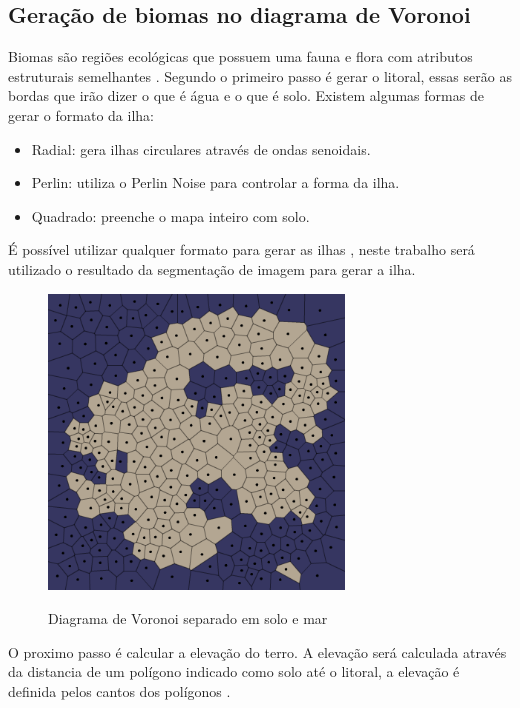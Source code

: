 \subsection{Geração de biomas no diagrama de Voronoi}

Biomas são regiões ecológicas que possuem uma fauna e flora com atributos estruturais semelhantes \cite{maestrovirtuale}. Segundo  o primeiro passo é gerar o litoral, essas serão as bordas que irão dizer o que é água e o que é solo. Existem algumas formas de gerar o formato da ilha:

\begin{itemize}
    \item Radial: gera ilhas circulares através de ondas senoidais.
    \item Perlin: utiliza o Perlin Noise para controlar a forma da ilha.
    \item Quadrado: preenche o mapa inteiro com solo.
\end{itemize}

É possível utilizar qualquer formato para gerar as ilhas \cite{amitp2010}, neste trabalho será utilizado o resultado da segmentação de imagem para gerar a ilha.

\begin{figure}[H]
	\caption{Diagrama de Voronoi separado em solo e mar}
	\centering %
	\includegraphics[width=0.7\textwidth]{figures/voronoi-land-water.png} %
	\label{fig:voronoi-land-water}
\end{figure}

O proximo passo é calcular a elevação do terro. A elevação será calculada através da distancia de um polígono indicado como solo até o litoral, a elevação é definida pelos cantos dos polígonos \cite{amitp2010}. 

